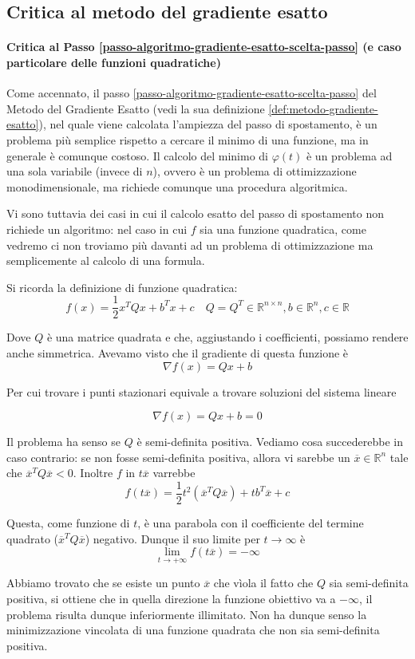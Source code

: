 \subsection{Critica al metodo del gradiente esatto}
\label{critica-gradiente-esatto}
\paragraph{Critica al Passo
\ref{passo-algoritmo-gradiente-esatto-scelta-passo} (e caso
particolare delle funzioni quadratiche)} Come accennato, il passo
\ref{passo-algoritmo-gradiente-esatto-scelta-passo} del Metodo del
Gradiente Esatto (vedi la sua definizione
\ref{def:metodo-gradiente-esatto}), nel quale viene calcolata
l'ampiezza del passo di spostamento, \`e un problema pi\`u semplice
rispetto a cercare il minimo di una funzione, ma in generale \`e
comunque costoso. Il calcolo del minimo di $\varphi(t)$ \`e un problema
ad una sola variabile (invece di $n$), ovvero \`e un problema di
ottimizzazione monodimensionale, ma richiede comunque una procedura
algoritmica.

Vi sono tuttavia dei casi in cui il calcolo esatto del passo di
spostamento non richiede un algoritmo: nel caso in cui $f$ sia una
funzione quadratica, come vedremo ci non troviamo pi\`u davanti ad un
problema di ottimizzazione ma semplicemente al calcolo di una formula.

Si ricorda la definizione di funzione quadratica:
$$f(x) = \frac{1}{2} x^{T} Qx + b^{T}x + c \quad Q = Q^{T} \in \mathbb{R}^{n\times n} ,b \in \mathbb{R}^{n}, c \in \mathbb{R}$$

Dove $Q$ \`e una matrice quadrata e che, aggiustando i coefficienti,
possiamo rendere anche simmetrica. Avevamo visto che il gradiente di
questa funzione \`e
$$ \nabla f(x) = Qx +b $$

Per cui trovare i punti stazionari equivale a trovare soluzioni del
sistema lineare

$$ \nabla f(x) = Qx +b = 0$$

\begin{property} Il problema ha senso se $Q$ \`e semi-definita
positiva. Vediamo cosa succederebbe in caso contrario: se non fosse
semi-definita positiva, allora vi sarebbe un $\overline{x} \in
\mathbb{R}^n$ tale che $\overline{x}^T Q \overline{x} < 0$. Inoltre
$f$ in $t\overline{x}$ varrebbe
$$f(t \overline{x}) = \frac{1}{2} t^2 (\overline{x}^T Q \overline{x}) + t b^T \overline{x} + c$$

Questa, come funzione di $t$, \`e una parabola con il coefficiente del
termine quadrato ($\overline{x}^T Q \overline{x}$) negativo. Dunque il
suo limite per $t \to \infty$ \`e
$$\lim_{t \to +\infty} f(t \overline{x}) = - \infty$$

Abbiamo trovato che se esiste un punto $\overline{x}$ che vìola il
fatto che $Q$ sia semi-definita positiva, si ottiene che in quella
direzione la funzione obiettivo va a $-\infty$, il problema risulta
dunque inferiormente illimitato. Non ha dunque senso la minimizzazione
vincolata di una funzione quadrata che non sia semi-definita positiva.
\end{property}

